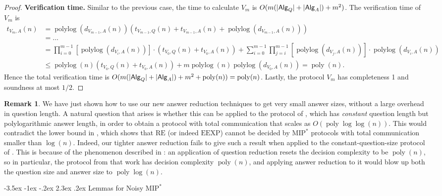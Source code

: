 \documentclass[10pt,a4paper]{article}
\makeatletter
\renewcommand{\section}{\@startsection {section}{1}{\z@}%
             {-3.5ex \@plus -1ex \@minus -.2ex}%
             {2.3ex \@plus .2ex}%
             {\normalfont\Large\scshape\bfseries}}
\theoremstyle{plain}
\theoremstyle{definition}
\newtheorem{remark}[theorem]{Remark}
\DeclarePairedDelimiter{\abs}{\lvert}{\rvert}
\newcommand{\poly} {\ensuremath{\operatorname{poly}}}
\newcommand{\polylog} {\ensuremath{\operatorname{polylog}}}
\newcommand{\1}{\mathbb{1}} %
\newcommand{\Alg}{\mathsf{Alg}}
\newcommand{\MIP}{\mathrm{MIP}}
\newcommand{\RE}{\mathrm{RE}}
\makeatother
\begin{document}
\begin{proof}
\textbf{Verification time.} Similar to the previous case, the time to calculate $V_m$ is
$O( m(\abs{\Alg_{Q}} + \abs{\Alg_{A}}) + m^2)$.
The verification time of $V_m$ is
\begin{align*}
    t_{V_m,A}(n) &= \polylog(d_{V_{m-1},A}(n))(t_{V_{m-1},Q}(n) + t_{V_{m-1},A}(n) + \polylog(d_{V_{m-1},A}(n))) \\
    & = \ldots \\
    & = \prod_{i=0}^{m-1} [\polylog(d_{V_i,A}(n))] \cdot (t_{V_0, Q}(n) + t_{V_0,A}(n)) + \sum_{i=0}^{m-1} \prod_{j=i}^{m-1} [\polylog(d_{V_j,A}(n))] \cdot 
    \polylog(d_{V_{i},A}(n)) \\
    & \leq \polylog(n) (t_{V_0, Q}(n) + t_{V_0,A}(n)) + m \polylog(n) \polylog(d_{V_0,A}(n)) = \poly(n).
\end{align*}
Hence the total verification time is $O( m(\abs{\Alg_{Q}} + \abs{\Alg_{A}}) + m^2 + \poly(n)) = \poly(n)$.
Lastly, the protocol $V_m$ has completeness 1 and soundness at most $1/2$.

\end{proof}

\begin{remark}
We have just shown how to use our new answer reduction techniques to get very small answer sizes, without a large overhead in question length. A natural question that arises is whether this can be applied to the protocol of \cite{ 10.1145/3564246.3585208}, which has \emph{constant} question length but polylogarithmic answer length, in order to obtain a protocol with total communication that scales as $O(\poly\log\log(n))$. This would contradict the lower bound in \cite{ 10.1145/3564246.3585208}, which shows that $\RE$ (or indeed $\mathrm{EEXP}$) cannot be decided by $\MIP^*$ protocols with total communication smaller than $\log(n)$. Indeed, our tighter answer reduction fails to give such a result when applied to the constant-question-size protocol of \cite{ 10.1145/3564246.3585208}. This is because of the phenomenon described in : an application of question reduction resets the decision complexity to be $\poly(n)$, so in particular, the protocol from that work has decision complexity $\poly(n)$, and applying answer reduction to it would blow up both the question size and answer size to $\poly\log(n)$.
\end{remark}





\appendix

%
\section{Lemmas for Noisy \texorpdfstring{$\mathrm{MIP}^\ast$}{MIP*}}
\end{document}
